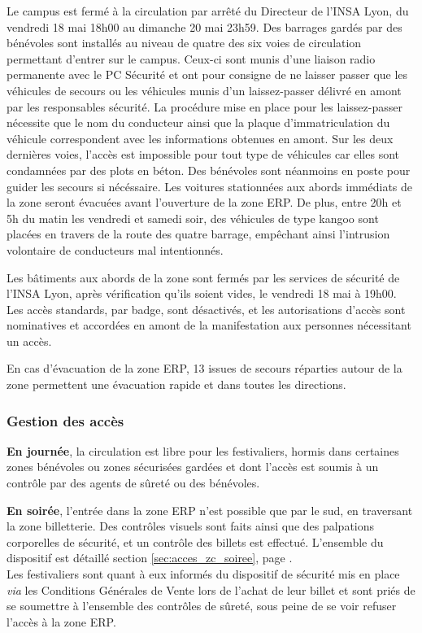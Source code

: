 \documentclass[hidelinks, paper=a4, fontsize=13pt]{report}
\begin{document}
\begin{list}{•}{}
	\item Le campus est fermé à la circulation par arrêté du Directeur de l'INSA Lyon, du vendredi 18 mai 18h00 au dimanche 20 mai 23h59. Des barrages gardés par des bénévoles sont installés au niveau de quatre des six voies de circulation permettant d'entrer sur le campus. Ceux-ci sont munis d'une liaison radio permanente avec le PC Sécurité et ont pour consigne de ne laisser passer que les véhicules de secours ou les véhicules munis d'un laissez-passer délivré en amont par les responsables sécurité. La procédure mise en place pour les laissez-passer nécessite que le nom du conducteur ainsi que la plaque d'immatriculation du véhicule correspondent avec les informations obtenues en amont. Sur les deux dernières voies, l'accès est impossible pour tout type de véhicules car elles sont condamnées par des plots en béton. Des bénévoles sont néanmoins en poste pour guider les secours si nécéssaire. Les voitures stationnées aux abords immédiats de la zone seront évacuées avant l'ouverture de la zone ERP. De plus, entre 20h et 5h du matin les vendredi et samedi soir, des véhicules de type kangoo sont placées en travers de la route des quatre barrage, empêchant ainsi l'intrusion volontaire de conducteurs mal intentionnés.
	\item Les bâtiments aux abords de la zone sont fermés par les services de sécurité de l'INSA Lyon, après vérification qu'ils soient vides, le vendredi 18 mai à 19h00. Les accès standards, par badge, sont désactivés, et les autorisations d'accès sont nominatives et accordées en amont de la manifestation aux personnes nécessitant un accès.
	\item En cas d'évacuation de la zone ERP, 13 issues de secours réparties autour de la zone permettent une évacuation rapide et dans toutes les directions.
\end{list}
 
\subsubsection{Gestion des accès} 
\begin{list}{•}{}
	\item \textbf{En journée}, la circulation est libre pour les festivaliers, hormis dans certaines zones bénévoles ou zones sécurisées gardées et dont l'accès est soumis à un contrôle par des agents de sûreté ou des bénévoles.\\
	\item \textbf{En soirée}, l'entrée dans la zone ERP n'est possible que par le sud, en traversant la zone billetterie. Des contrôles visuels sont faits ainsi que des palpations corporelles de sécurité, et un contrôle des billets est effectué. L'ensemble du dispositif est détaillé section \ref{sec:acces_zc_soiree}, page \pageref{sec:acces_zc_soiree}.\\
Les festivaliers sont quant à eux informés du dispositif de sécurité mis en place \textit{via} les Conditions Générales de Vente lors de l'achat de leur billet et sont priés de se soumettre à l'ensemble des contrôles de sûreté, sous peine de se voir refuser l'accès à la zone ERP.
\end{list}
\end{document}
